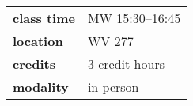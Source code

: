     \begin{tabular}{ll}
        \textbf{class time} & MW 15:30--16:45 \\
        \textbf{location} & WV 277\\
        \textbf{credits} & 3 credit hours\\
        \textbf{modality} & in person
    \end{tabular}
